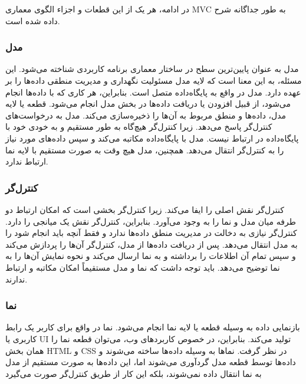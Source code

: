 در ادامه، هر یک از این قطعات و اجزاء الگوی معماری MVC به طور جداگانه شرح داده شده است.

\subsubsection{مدل}
مدل به عنوان پایین‌ترین سطح در ساختار معماری برنامه کاربردی شناخته می‌شود. این مسئله، به این معنا است که لایه مدل مسئولیت نگهداری و مدیریت منطقی داده‌ها را بر عهده دارد. مدل در واقع به پایگاه‌داده متصل است. بنابراین، هر کاری که با داده‌ها انجام می‌شود، از قبیل افزودن یا دریافت داده‌ها در بخش مدل انجام می‌شود. قطعه یا لایه مدل، داده‌ها و منطق مربوط به آن‌ها را ذخیره‌سازی می‌کند. مدل به درخواست‌های کنترل‌گر‌ پاسخ می‌دهد. زیرا کنترل‌گر‌ هیچ‌گاه به طور مستقیم و به خودی خود با پایگاه‌داده در ارتباط نیست. مدل با پایگاه‌داده مکاتبه می‌کند و سپس داده‌های مورد نیاز را به کنترل‌گر انتقال می‌دهد. همچنین، مدل هیچ وقت به صورت مستقیم با لایه نما ارتباط ندارد.

\subsubsection{کنترل‌گر}
کنترل‌گر نقش اصلی را ایفا می‌کند. زیرا کنترل‌گر بخشی است که امکان ارتباط دو طرفه میان مدل و نما را به وجود می‌آورد. بنابراین، کنترل‌گر نقش یک میانجی را دارد. کنترل‌گر نیازی به دخالت در مدیریت منطق داده‌ها ندارد و فقط آنچه باید انجام شود را به مدل انتقال می‌دهد. پس از دریافت داده‌ها از مدل، کنترل‌گر‌ آن‌ها را پردازش می‌کند و سپس تمام آن اطلاعات را برداشته و به نما ارسال می‌کند و نحوه نمایش آن‌ها را به نما توضیح می‌دهد. باید توجه داشت که نما و مدل مستقیماً امکان مکاتبه و ارتباط ندارند.

\subsubsection{نما}
بازنمایی داده به وسیله قطعه یا لایه نما انجام می‌شود. نما در واقع برای کاربر یک رابط کاربری یا UI تولید می‌کند. بنابراین، در خصوص کاربردهای وب، می‌توان قطعه نما را همان بخش HTML و CSS در نظر گرفت. نماها به وسیله داده‌ها ساخته می‌شوند و داده‌ها توسط قطعه مدل گردآوری می‌شوند اما، این داده‌ها به صورت مستقیم از مدل به نما انتقال داده نمی‌شوند، بلکه این کار از طریق کنترل‌گر صورت می‌گیرد

